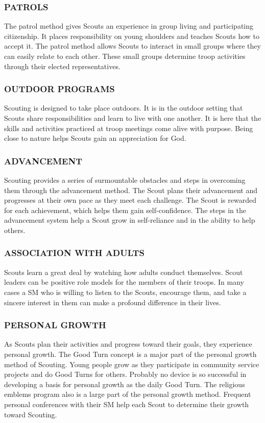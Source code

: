 \documentclass{ltxguide}
\begin{document}
\subsubsection{PATROLS}
The patrol method gives Scouts an experience in group living and participating citizenship. It places responsibility on young shoulders and teaches Scouts how to accept it. The patrol method allows Scouts to interact in small groups where they can easily relate to each other. These small groups determine troop activities through their elected representatives.

\subsubsection{OUTDOOR PROGRAMS}
Scouting is designed to take place outdoors. It is in the outdoor setting that Scouts share responsibilities and learn to live with one another. It is here that the skills and activities practiced at troop meetings come alive with purpose. Being close to nature helps Scouts gain an appreciation for God.

\subsubsection{ADVANCEMENT}
Scouting provides a series of surmountable obstacles and steps in overcoming them through the advancement method. The Scout plans their advancement and progresses at their own pace as they meet each challenge. The Scout is rewarded for each achievement, which helps them gain self-confidence. The steps in the advancement system help a Scout grow in self-reliance and in the ability to help others.

\subsubsection{ASSOCIATION WITH ADULTS}
Scouts learn a great deal by watching how adults conduct themselves. Scout leaders can be positive role models for the members of their troops. In many cases a \ac{SM} who is willing to listen to the Scouts, encourage them, and take a sincere interest in them can make a profound difference in their lives.

\subsubsection{PERSONAL GROWTH}
As Scouts plan their activities and progress toward their goals, they experience personal growth. The Good Turn concept is a major part of the personal growth method of Scouting. Young people grow as they participate in community service projects and do Good Turns for others. Probably no device is so successful in developing a basis for personal growth as the daily Good Turn. The religious emblems program also is a large part of the personal growth method. Frequent personal conferences with their \ac{SM} help each Scout to determine their growth toward Scouting.
\end{document}
